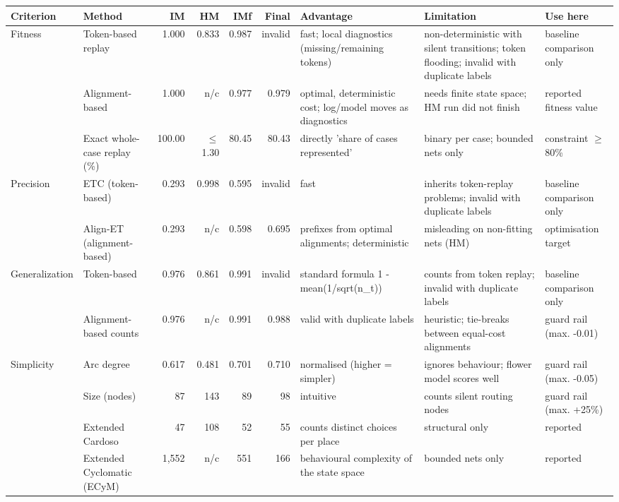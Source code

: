 \begin{tabular}{llrrrrp{}p{}l}
\hline
Criterion & Method & IM & HM & IMf & Final & Advantage & Limitation & Use here \\
\hline
Fitness & Token-based replay & 1.000 & 0.833 & 0.987 & invalid & fast; local diagnostics (missing/remaining tokens) & non-deterministic with silent transitions; token flooding; invalid with duplicate labels & baseline comparison only \\
 & Alignment-based & 1.000 & n/c & 0.977 & 0.979 & optimal, deterministic cost; log/model moves as diagnostics & needs finite state space; HM run did not finish & reported fitness value \\
 & Exact whole-case replay (\%) & 100.00 & $\leq$ 1.30 & 80.45 & 80.43 & directly 'share of cases represented' & binary per case; bounded nets only & constraint $\geq$ 80\% \\
Precision & ETC (token-based) & 0.293 & 0.998 & 0.595 & invalid & fast & inherits token-replay problems; invalid with duplicate labels & baseline comparison only \\
 & Align-ET (alignment-based) & 0.293 & n/c & 0.598 & 0.695 & prefixes from optimal alignments; deterministic & misleading on non-fitting nets (HM) & optimisation target \\
Generalization & Token-based & 0.976 & 0.861 & 0.991 & invalid & standard formula 1 - mean(1/sqrt(n\_t)) & counts from token replay; invalid with duplicate labels & baseline comparison only \\
 & Alignment-based counts & 0.976 & n/c & 0.991 & 0.988 & valid with duplicate labels & heuristic; tie-breaks between equal-cost alignments & guard rail (max. -0.01) \\
Simplicity & Arc degree & 0.617 & 0.481 & 0.701 & 0.710 & normalised (higher = simpler) & ignores behaviour; flower model scores well & guard rail (max. -0.05) \\
 & Size (nodes) & 87 & 143 & 89 & 98 & intuitive & counts silent routing nodes & guard rail (max. +25\%) \\
 & Extended Cardoso & 47 & 108 & 52 & 55 & counts distinct choices per place & structural only & reported \\
 & Extended Cyclomatic (ECyM) & 1,552 & n/c & 551 & 166 & behavioural complexity of the state space & bounded nets only & reported \\
\hline
\end{tabular}
